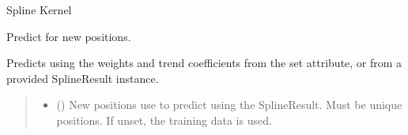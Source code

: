 \documentclass[letterpaper,10pt,english]{sphinxmanual}
\begin{document}
\begin{fulllineitems}

\begin{fulllineitems}
\label{\detokenize{splines:glomar_gridding.spline.Spline.kernel}}
\pysigstartsignatures
\pysiglinewithargsret
{}
{}
{}
\pysigstopsignatures
\sphinxAtStartPar
Spline Kernel
\begin{quote}\begin{description}
\sphinxAtStartPar
{}

\end{description}\end{quote}

\end{fulllineitems}


\begin{fulllineitems}
\label{\detokenize{splines:glomar_gridding.spline.Spline.predict}}
\pysigstartsignatures
\pysiglinewithargsret
{}
{\sphinxparamcomma {}\sphinxparamcomma {}}
{}
\pysigstopsignatures
\sphinxAtStartPar
Predict for new positions.

\sphinxAtStartPar
Predicts using the weights and trend coefficients from the set 
attribute, or from a provided SplineResult instance.
\begin{quote}\begin{description}
\begin{itemize}
\item {}
\sphinxAtStartPar
{} () \textendash{} New positions use to predict using the SplineResult. Must be unique
positions. If unset, the training data is used.


\end{itemize}
\end{description}
\end{quote}
\end{fulllineitems}
\end{fulllineitems}
\end{document}
